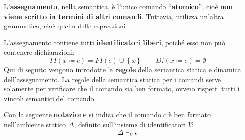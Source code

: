 \documentclass[a4paper]{article}
\newcommand{\dquotes}[1]{``#1''}
\begin{document}
 	\noindent
 	L'\textbf{assegnamento}, nella semantica, è l'unico comando \dquotes{\textbf{atomico}}, cioè \textbf{non viene scritto in termini di altri comandi}. Tuttavia, utilizza un'altra grammatica, cioè quella delle espressioni.\newline
 	
 	\noindent
 	L'assegnamento contiene tutti \textbf{identificatori liberi}, poiché esso non può contenere dichiarazioni:
 	\begin{equation*}
 		FI\left(x \coloneq e\right) = FI\left(e\right) \cup \left\{x\right\} \hspace{2em} DI\left(x \coloneq e\right) = \emptyset
 	\end{equation*}
 	Qui di seguito vengono introdotte le \textcolor{Red3}{\textbf{regole}} della semantica statica e dinamica dell'assegnamento. La regole della semantica statica per i comandi serve solamente per verificare che il comando sia ben formato, ovvero rispetti tutti i vincoli semantici del comando. 
 	
 	Con la seguente \textbf{notazione} si indica che il comando $c$ è ben formato nell'ambiente statico $\Delta$, definito sull'insieme di identificatori $V$:
 	\begin{equation*}
 		\Delta \vdash_{V} c
 	\end{equation*}\newpage
 	
\end{document}
